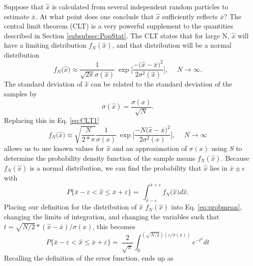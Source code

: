 Suppose that $\hat{x}$ is calculated from several independent random particles
to estimate $\bar{x}$. At what point does one conclude that $\hat{x}$ sufficiently
reflects $\bar{x}$?
The central limit theorem (CLT) \cite{lewis_computational_1984, mcnp_manual_v1}
is a very powerful supplement to the quantities
described in Section \ref{subsubsec:PopStat}. The CLT states that for large N,
$\hat{x}$ will have a limiting distribution $f_N(\hat{x})$, and that distribution will be a
normal distribution
\begin{equation}
  f_N\big(\hat{x}\big) \approx \frac{1}{\sqrt{2\pi} \sigma(\hat{x})}\
           \exp\Bigg[ \frac{-\big( \hat{x}- \bar{x}\big)^2}{2\sigma^2(\hat{x})} \Bigg],\
           \quad N \rightarrow \infty.
  \label{eq:CLT1}
\end{equation}
The standard deviation of $\hat{x}$ can be related to the standard deviation of
the samples by
\begin{equation}
  \sigma(\hat{x}) = \frac{\sigma(x)}{\sqrt{N}}.
\end{equation}
Replacing this in Eq. \eqref{eq:CLT1}
\begin{equation}
  f_N\big(\hat{x}\big) \approx \sqrt{\frac{N}{2*\pi}} \frac{1}{\sigma(x)}\
           \exp\Bigg[ \frac{-N\big( \hat{x}- \bar{x}\big)^2}{2\sigma^2(x)} \Bigg],\
           \quad N \rightarrow \infty
  \label{eq:CLT2}
\end{equation}
allows us to use known values for $\hat{x}$ and an approximation of $\sigma(x)$
using $S$ to determine the probability density function of the sample means
$f_N(\hat{x})$. Because $f_N(\hat{x})$ is a normal distribution, we can find the
probability that $\hat{x}$ lies in $\bar{x} \pm \epsilon$ with
\begin{equation}
  P\big\{\bar{x} - \varepsilon < \hat{x} \leq \bar{x} + \varepsilon\big\} = \
   \int_{\bar{x}-\varepsilon}^{\bar{x}+\varepsilon}f_N\big( \hat{x} \big) d\hat{x}.
   \label{eq:probmean}
\end{equation}
Placing our definition for the distribution of $\hat{x}$ $f_N(\hat{x})$ into Eq.
\eqref{eq:probmean}, changing the limits of integration, and changing the
variables such that $t = \sqrt{N/2}*(\hat{x}-\bar{x})/\sigma(x)$, this becomes
\begin{equation}
  P\big\{\bar{x} - \varepsilon < \hat{x} \leq \bar{x} + \varepsilon\big\} = \
  \frac{2}{\sqrt{\pi}} \int_0^{(\sqrt{N/2})(\varepsilon/\sigma(x))} e^{-t^2} dt
\end{equation}
Recalling the definition of the error function, ends up as
